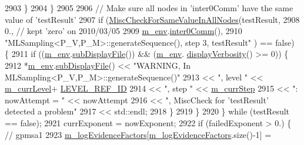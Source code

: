 \begin{DoxyCode}
2903           \}
2904         \}
2905 
2906         \textcolor{comment}{// Make sure all nodes in 'inter0Comm' have the same value of 'testResult'}
2907         \textcolor{keywordflow}{if} (\hyperlink{namespace_q_u_e_s_o_a4166a375c5adbea35afaaf20775bc519}{MiscCheckForSameValueInAllNodes}(testResult,
2908                                               0., \textcolor{comment}{// kept 'zero' on 2010/03/05}
2909                                               \hyperlink{class_q_u_e_s_o_1_1_m_l_sampling_a13f1ca4fe9f94822fe572a743eaced1d}{m\_env}.\hyperlink{class_q_u_e_s_o_1_1_base_environment_a689e4d140c74d495d97eb498714a4b82}{inter0Comm}(),
2910                                               \textcolor{stringliteral}{"MLSampling<P\_V,P\_M>::generateSequence(), step 3, testResult"}
      ) == \textcolor{keyword}{false}) \{
2911           \textcolor{keywordflow}{if} ((\hyperlink{class_q_u_e_s_o_1_1_m_l_sampling_a13f1ca4fe9f94822fe572a743eaced1d}{m\_env}.\hyperlink{class_q_u_e_s_o_1_1_base_environment_a8a0064746ae8dddfece4229b9ad374d6}{subDisplayFile}()) && (\hyperlink{class_q_u_e_s_o_1_1_m_l_sampling_a13f1ca4fe9f94822fe572a743eaced1d}{m\_env}.
      \hyperlink{class_q_u_e_s_o_1_1_base_environment_a1fe5f244fc0316a0ab3e37463f108b96}{displayVerbosity}() >= 0)) \{
2912             *\hyperlink{class_q_u_e_s_o_1_1_m_l_sampling_a13f1ca4fe9f94822fe572a743eaced1d}{m\_env}.\hyperlink{class_q_u_e_s_o_1_1_base_environment_a8a0064746ae8dddfece4229b9ad374d6}{subDisplayFile}() << \textcolor{stringliteral}{"WARNING, In
       MLSampling<P\_V,P\_M>::generateSequence()"}
2913                                     << \textcolor{stringliteral}{", level "}        << \hyperlink{class_q_u_e_s_o_1_1_m_l_sampling_af9416874c856e50f3b35270e801f17e4}{m\_currLevel}+
      \hyperlink{_m_l_sampling_level_options_8h_a68d15eaf394d210effcf584b938206d3}{LEVEL\_REF\_ID}
2914                                     << \textcolor{stringliteral}{", step "}         << \hyperlink{class_q_u_e_s_o_1_1_m_l_sampling_a1b1f8ccb4823bdfa26ec652f0807c63e}{m\_currStep}
2915                                     << \textcolor{stringliteral}{": nowAttempt = "} << nowAttempt
2916                                     << \textcolor{stringliteral}{", MiscCheck for 'testResult' detected a problem"}
2917                                     << std::endl;
2918           \}
2919         \}
2920       \} \textcolor{keywordflow}{while} (testResult == \textcolor{keyword}{false});
2921       currExponent = nowExponent;
2922       \textcolor{keywordflow}{if} (failedExponent > 0.) \{ \textcolor{comment}{// gpmsa1}
2923         \hyperlink{class_q_u_e_s_o_1_1_m_l_sampling_a75f2ceab4a2c6774b3fa07d74221dbf3}{m\_logEvidenceFactors}[\hyperlink{class_q_u_e_s_o_1_1_m_l_sampling_a75f2ceab4a2c6774b3fa07d74221dbf3}{m\_logEvidenceFactors}.size()-1] = 

\end{DoxyCode}
